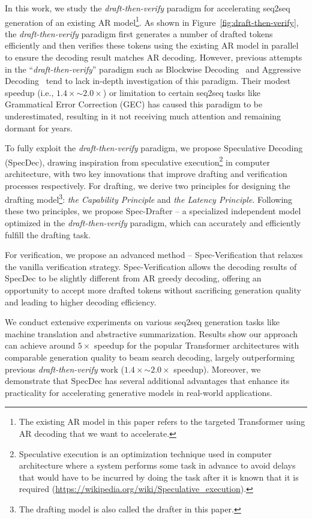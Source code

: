 In this work, we study the \textit{draft-then-verify} paradigm for accelerating seq2seq generation of an existing AR model\footnote{The existing AR model in this paper refers to the targeted Transformer using AR decoding that we want to accelerate.}. As shown in Figure~\ref{fig:draft-then-verify}, the \textit{draft-then-verify} paradigm first generates a number of drafted tokens efficiently and then verifies these tokens using the existing AR model in parallel to ensure the decoding result matches AR decoding. However, previous attempts in the ``\textit{draft-then-verify}'' paradigm such as Blockwise Decoding~\citep{Stern:2018blockwise} and Aggressive Decoding~\citep{Sun:2020SAD} tend to lack in-depth investigation of this paradigm. Their modest speedup (i.e., $1.4\times$$\sim$$2.0\times$) or limitation to certain seq2seq tasks like Grammatical Error Correction (GEC) has caused this paradigm to be underestimated, resulting in it not receiving much attention and remaining dormant for years.

To fully exploit the \textit{draft-then-verify} paradigm, we propose Speculative Decoding (SpecDec), drawing inspiration from speculative execution\footnote{Speculative execution is an optimization technique used in computer architecture where a system performs some task in advance to avoid delays that would have to be incurred by doing the task after it is known that it is required (\url{https://wikipedia.org/wiki/Speculative_execution}).} in computer architecture, with two key innovations that improve drafting and verification processes respectively. For drafting, we derive two principles for designing the drafting model\footnote{The drafting model is also called the drafter in this paper.}: \textit{the Capability Principle} and \textit{the Latency Principle}. Following these two principles, we propose Spec-Drafter -- a specialized independent model optimized in the \textit{draft-then-verify} paradigm, which can accurately and efficiently fulfill the drafting task.

For verification, we propose an advanced method -- Spec-Verification that relaxes the vanilla verification strategy. Spec-Verification allows the decoding results of SpecDec to be slightly different from AR greedy decoding, offering an opportunity to accept more drafted tokens without sacrificing generation quality and leading to higher decoding efficiency. 

We conduct extensive experiments on various seq2seq generation tasks like machine translation and abstractive summarization. Results show our approach can achieve around $5\times$ speedup for the popular Transformer architectures with comparable generation quality to beam search decoding, largely outperforming previous \textit{draft-then-verify} work ($1.4\times$$\sim$$2.0\times$ speedup). Moreover, we demonstrate that SpecDec has several additional advantages that enhance its practicality for accelerating generative models in real-world applications.

